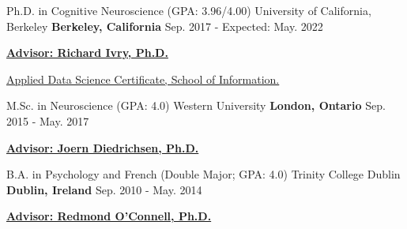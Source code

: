 

\begin{cventries}

  \cventry
    {Ph.D. in Cognitive Neuroscience (GPA: 3.96/4.00)} %
    {University of California, Berkeley} %
    {\textbf{Berkeley, California}} %
    {Sep. 2017 - Expected: May. 2022} %
    {
      \begin{cvitems} %
        \item {{\href{http://ivrylab.berkeley.edu/rich-ivry.html}{\textbf{Advisor: Richard Ivry, Ph.D.}}}}
        \item {{\href{https://www.ischool.berkeley.edu/programs/data-science-certificate}{Applied Data Science Certificate, School of Information.}}} 
      \end{cvitems}
    }

  \cventry
    {M.Sc. in Neuroscience (GPA: 4.0)} %
    {Western University} %
    {\textbf{London, Ontario}} %
    {Sep. 2015 - May. 2017} %
    {
      \begin{cvitems} %
        \item {{\href{http://www.diedrichsenlab.org/}{\textbf{Advisor: Joern Diedrichsen, Ph.D.}}}}
      \end{cvitems}
    }
    
  \cventry
    {B.A. in Psychology and French (Double Major; GPA: 4.0)} %
    {Trinity College Dublin} %
    {\textbf{Dublin, Ireland}} %
    {Sep. 2010 - May. 2014} %
    {
      \begin{cvitems} %
        \item {{\href{https://oconnell-lab.com/home/meet-the-team/redmond-oconnell/}{\textbf{Advisor: Redmond O'Connell, Ph.D.}}}}
      \end{cvitems}
    }

\end{cventries}
